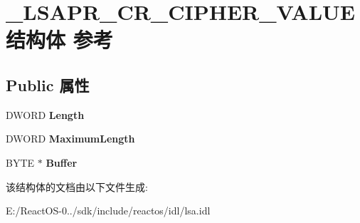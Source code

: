 \hypertarget{struct___l_s_a_p_r___c_r___c_i_p_h_e_r___v_a_l_u_e}{}\section{\+\_\+\+L\+S\+A\+P\+R\+\_\+\+C\+R\+\_\+\+C\+I\+P\+H\+E\+R\+\_\+\+V\+A\+L\+U\+E结构体 参考}
\label{struct___l_s_a_p_r___c_r___c_i_p_h_e_r___v_a_l_u_e}
\subsection*{Public 属性}
\begin{DoxyCompactItemize}
\item 
\mbox{\label{struct___l_s_a_p_r___c_r___c_i_p_h_e_r___v_a_l_u_e_a2860dcf6bcef53af75fdfaa2d83dc69e}} 
D\+W\+O\+RD {\bfseries Length}
\item 
\mbox{\label{struct___l_s_a_p_r___c_r___c_i_p_h_e_r___v_a_l_u_e_a4a330186f6a8ed09d5a19930a3f8a9f7}} 
D\+W\+O\+RD {\bfseries Maximum\+Length}
\item 
\mbox{\label{struct___l_s_a_p_r___c_r___c_i_p_h_e_r___v_a_l_u_e_a4f6e1bc872b17a7bc3712021fa99ec86}} 
B\+Y\+TE $\ast$ {\bfseries Buffer}
\end{DoxyCompactItemize}


该结构体的文档由以下文件生成\+:\begin{DoxyCompactItemize}
\item 
E\+:/\+React\+O\+S-\/0../sdk/include/reactos/idl/lsa.\+idl\end{DoxyCompactItemize}
